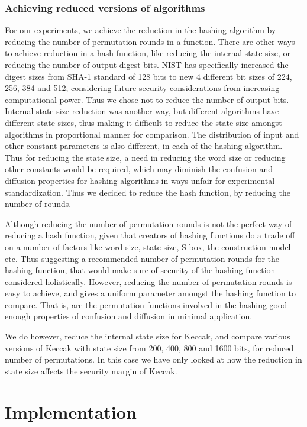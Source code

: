 \subsubsection{Achieving reduced versions of algorithms}
For our experiments, we achieve the reduction in the hashing algorithm by reducing the number of permutation
rounds in a function. There are other ways to achieve reduction in a hash function, like reducing the internal
state size, or reducing the number of output digest bits. NIST has specifically increased the digest sizes from
SHA-1 standard of 128 bits to new 4 different bit sizes of 224, 256, 384 and 512; considering future security
considerations from increasing computational power. Thus we chose not to reduce the number of output bits.
Internal state size reduction was another way, but different algorithms have different state sizes, thus making
it difficult to reduce the state size amongst algorithms in proportional manner for comparison. The
distribution of input and other constant parameters is also different, in each of the hashing algorithm. Thus
for reducing the state size, a need in reducing the word size or reducing other constants would be required,
which may diminish the confusion and diffusion properties for hashing algorithms in ways unfair for experimental
standardization. Thus we decided to reduce the hash function, by reducing the number of rounds.

Although reducing the number of permutation rounds is not the perfect way of reducing a hash function, given 
that creators of hashing functions do a trade off on a number of factors like word size, state size, S-box,
the construction model etc. Thus suggesting a recommended number of permutation rounds for the hashing function,
that would make sure of security of the hashing function considered holistically. However, reducing the number
of permutation rounds is easy to achieve, and gives a uniform parameter amongst the hashing function to compare.
That is, are the permutation functions involved in the hashing good enough properties of confusion and
diffusion in minimal application.

We do however, reduce the internal state size for Keccak, and compare various versions of Keccak with state size
from 200, 400, 800 and 1600 bits, for reduced number of permutations. In this case we have only looked at how
the reduction in state size affects the security margin of Keccak.

\section{Implementation}

